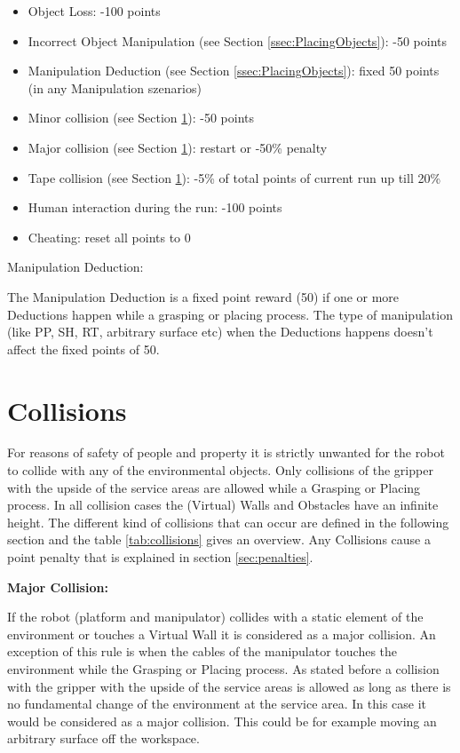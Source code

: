 \begin{itemize}
	\item Object Loss: \hfill -100 points
	\item Incorrect Object Manipulation (see Section \ref{ssec:PlacingObjects}): \hfill -50 points
	\item Manipulation Deduction (see Section \ref{ssec:PlacingObjects}): \hfill fixed 50 points (in any Manipulation szenarios)
	\item Minor collision (see Section \ref{sec:Collisions}): \hfill -50 points
	\item Major collision (see Section \ref{sec:Collisions}): \hfill restart or -50\% penalty
  \item Tape collision (see Section \ref{sec:Collisions}): \hfill -5\% of total points of current run up till
  20\%
  \item Human interaction during the run: \hfill  -100 points
  \item Cheating: \hfill reset all points to 0
\end{itemize}

Manipulation Deduction:

The Manipulation Deduction is a fixed point reward (50) if one or more Deductions happen while a grasping or placing process. The type of manipulation (like PP, SH, RT, arbitrary surface etc) when the Deductions happens doesn't affect the fixed points of 50.

\section{Collisions}\label{sec:Collisions}

For reasons of safety of people and property it is strictly unwanted for the robot to collide
with any of the environmental objects. Only collisions of the gripper with the upside of
the service areas are allowed while a Grasping or Placing process. In all collision cases the (Virtual) Walls and Obstacles have an infinite height. The different kind of collisions that can occur are defined in the
following section and the table \ref{tab:collisions} gives an overview. Any Collisions cause a point penalty that is explained in section \ref{sec:penalties}.  

\textbf{Major Collision:}

If the robot (platform and manipulator) collides with a static element of the environment or touches a Virtual Wall it is considered as a major collision. An exception of this rule is when the cables of the manipulator touches the environment while the Grasping or Placing process. As stated before a collision with the  gripper with the upside of the service areas is allowed as long as there is no fundamental change of the environment at the service area. In this case it would be considered as a major collision. This could be for example moving an arbitrary surface off the workspace. 

